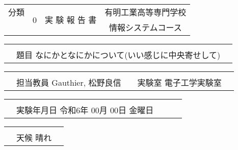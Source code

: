\documentclass[10pt]{ltjsarticle}
\begin{document}
\thispagestyle{empty}

\begingroup
\renewcommand{\arraystretch}{1.25}
\begin{center}
\begin{tabular}{|p{1.2cm}p{1.6cm}p{7.6cm}p{5.3cm}p{1.2cm}|}
  \hline
  \multicolumn{1}{|c|}{\large 分類} & \multicolumn{1}{c}{\multirow{2}{*}{
    \vspace{-4pt}\Huge 0
    }} & \multicolumn{1}{|c|}{\multirow{2}{*}{
    \Huge\vspace{-4pt}\quad 実 験 報 告 書 \quad}} & \multicolumn{2}{c|}{
    \quad\Large\hspace{.5pt}有明工業高等専門学校\hspace{11.8pt}\quad}\\
  \cline{1-1}
  &  &\multicolumn{1}{|c|}{} & \multicolumn{2}{c|}{
    \quad\Large\hspace{.7pt}情報システムコース\hspace{11.8pt}\quad}\\
  \hline
\end{tabular}
\vspace{-1pt}
\begin{tabular}{|p{1.2cm}p{13.5435cm}p{1.2cm}|}
  & & \multicolumn{1}{c|}{}\\
  &\Large 
  題目 \qquad なにかとなにかについて(いい感じに中央寄せして)
  & \\
  \cline{2-2} 
\end{tabular}
\vspace{-1pt}
\begin{tabular}{|p{1.2cm}p{7cm}p{.6cm}p{5.1cm}p{1.2cm}|}
  & & & & \multicolumn{1}{c|}{}\\&\Large 
  担当教員 \: Gauthier, 松野良信
  & &\Large 
  実験室 \: 電子工学実験室
  & \\\cline{2-2} \cline{4-4}
\end{tabular}
\vspace{-1pt}
\begin{tabular}{|p{1.2cm}p{8.7cm}p{0cm}p{4cm}p{1.2cm}|}
  & & & & \multicolumn{1}{c|}{}\\&\Large 
  実験年月日 \: 令和6年 00月 00日 金曜日
  & & & \\\cline{2-2} 
\end{tabular}
\vspace{-1pt}
\begin{tabular}{|p{1.2cm}p{13.5435cm}p{1.2cm}|}
  & & \multicolumn{1}{c|}{}\\
  &\Large 
  天候 \quad 晴れ\quad

\end{tabular}
\end{center}
\end{document}
